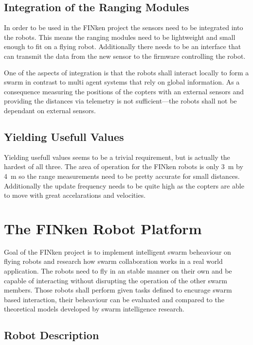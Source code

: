 \subsection{Integration of the Ranging Modules}
\label{req2}
In order to be used in the FINken project the sensors need to be integrated into the robots.
This means the ranging modules need to be lightweight and small enough to fit on a flying robot.
Additionally there needs to be an interface that can transmit the data from the new sensor to the firmware controlling the robot.

One of the aspects of integration is that the robots shall interact locally to form a swarm in contrast to multi agent systems that rely on global information.
As a consequence measuring the positions of the copters with an external sensors and providing the distances via telemetry is not sufficient—the robots shall not be dependant on external sensors.

\subsection{Yielding Usefull Values}
\label{req3}
Yielding usefull values seems to be a trivial requirement, but is actually the hardest of all three.
The area of operation for the FINken robots is only \SI{3}{m} by \SI{4}{m} so the range measurements need to be pretty accurate for small distances. 
Additionally the update frequency needs to be quite high as the copters are able to move with great accelarations and velocities.

\section{The FINken Robot Platform}


Goal of the FINken project is to implement intelligent swarm beheaviour on flying robots and research how swarm collaboration works in a real world application.
The robots need to fly in an stable manner on their own and be capable of interacting without disrupting the operation of the other swarm members.
Those robots shall perform given tasks defined to encurage swarm based interaction, their beheaviour can be evaluated and compared to the theoretical models developed by swarm intelligence research.

\subsection{Robot Description}


